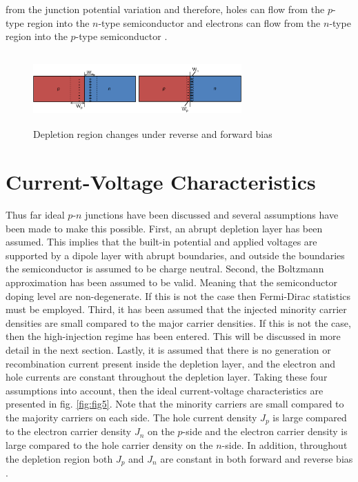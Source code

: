 \documentclass[%
 reprint,
 amsmath,amssymb,
 aps,
pra,
floatfix,
]{revtex4-1}
\begin{document}
from the junction potential variation and therefore, holes can flow from the $p$-type region into the $n$-type semiconductor and electrons can flow
from the $n$-type region into the $p$-type semiconductor \cite{Sze}. 
%
\begin{figure}[h!]
    \centering
    \includegraphics[height=2.75cm, width=8cm]{figs/bias_dep_region}
    \caption{Depletion region changes under reverse and forward bias}
    \label{fig:fig11}
\end{figure}
%
\section{Current-Voltage Characteristics}\label{sec:cv_ideal}
Thus far ideal $p$-$n$ junctions have been discussed and several assumptions have been made to make 
this possible. First, an abrupt depletion layer has been assumed. This implies that the built-in potential
and applied voltages are supported by a dipole layer with abrupt boundaries, and outside the boundaries the semiconductor is assumed 
to be charge neutral. Second, the Boltzmann approximation has been assumed to be valid. Meaning that the semiconductor
doping level are non-degenerate. If this is not the case then Fermi-Dirac statistics must be employed. 
Third, it has been assumed that the injected minority carrier densities are small compared to the major carrier
densities. If this is not the case, then the high-injection regime has been entered. This will be discussed in more detail in the next section.
Lastly, it is assumed that there is no generation or recombination current present inside the depletion layer,
and the electron and hole currents are constant throughout the depletion layer. Taking these four assumptions into 
account, then the ideal current-voltage characteristics are presented in fig. \ref{fig:fig5}. Note that the minority carriers
are small compared to the majority carriers on each side. The hole current density $J_p$ is large compared to the electron 
carrier density $J_n$ on the $p$-side and the electron carrier density is large compared to the hole carrier density on the $n$-side. In addition,
throughout the depletion region both $J_p$ and $J_n$ are constant in both forward and reverse bias \cite{Sze}.
\end{document}
